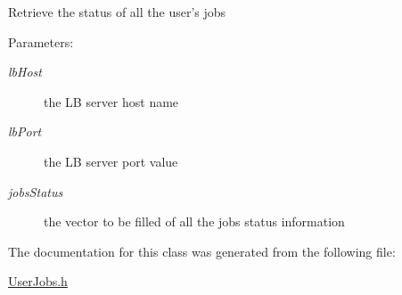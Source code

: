 Retrieve the status of all the user's jobs \begin{Desc}
\item[Parameters:]
\begin{description}
\item[{\em lb\-Host}]the LB server host name \item[{\em lb\-Port}]the LB server port value \item[{\em jobs\-Status}]the vector to be filled of all the jobs status information \end{description}
\end{Desc}


The documentation for this class was generated from the following file:\begin{CompactItemize}
\item 
\hyperlink{UserJobs_8h}{User\-Jobs.h}\end{CompactItemize}

